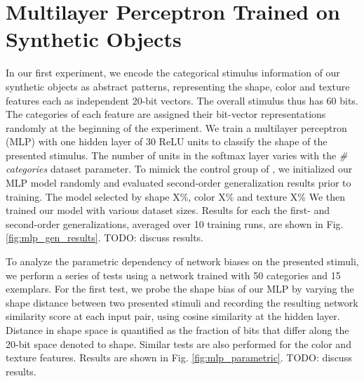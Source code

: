 \section{Multilayer Perceptron Trained on Synthetic Objects}
\label{sec:simple_mlp}

In our first experiment, we encode the categorical stimulus information of our
synthetic objects as abstract patterns, representing the shape, color and
texture features each as independent 20-bit vectors. The overall stimulus thus
has 60 bits. The categories of each feature are assigned their bit-vector representations
randomly at the beginning of the experiment. We train a multilayer perceptron (MLP)
with one hidden layer of 30 ReLU units to classify the shape of the presented
stimulus. The number of units in the softmax layer varies with the
\textit{\# categories} dataset parameter. To mimick the control group of
\cite{Smith2002}, we initialized our MLP model randomly and evaluated
second-order generalization results prior to training. The model selected by
shape X\%, color X\% and texture X\% We then trained our model with various
dataset sizes. Results for each the first- and second-order generalizations,
averaged over 10 training runs, are shown in Fig. \ref{fig:mlp_gen_results}.
TODO: discuss results.

To analyze the parametric dependency of network biases on the presented
stimuli, we perform a series of tests using a network trained with 50 categories
and 15 exemplars. For the first test, we probe the shape bias of our MLP by
varying the shape distance between two presented stimuli and recording the resulting
network similarity score at each input pair, using cosine similarity at the
hidden layer. Distance in shape space is quantified as the fraction of bits that
differ along the 20-bit space denoted to shape. Similar tests are also performed
for the color and texture features. Results are shown in Fig.
\ref{fig:mlp_parametric}. TODO: discuss results.

